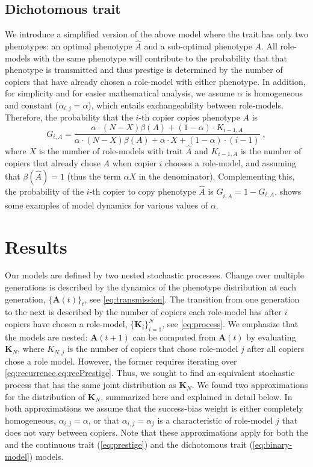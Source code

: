 \documentclass[12pt]{extarticle}
\let\vec\mathbf
\begin{document}
\subsection*{Dichotomous trait}
We introduce a simplified version of the above model where the trait has only two phenotypes: an optimal phenotype $\hat{A}$ and a sub-optimal phenotype $A$. 
All role-models with the same phenotype will contribute to the probability that that phenotype is transmitted and thus prestige is determined by the number of copiers that have already chosen a role-model with either phenotype.
In addition, for simplicity and for easier mathematical analysis, we assume $\alpha$ is homogeneous and constant ($\alpha_{i,j}=\alpha$), which entails exchangeability between role-models.
Therefore, the probability that the $i$-th copier {copies} phenotype $A$ is
\begin{equation}\label{eq:binary-model}
G_{i,A} = \frac{\alpha \cdot (N-X) \beta(A) + (1-\alpha) \cdot K_{i-1,A}}{\alpha \cdot (N-X) \beta(A) + \alpha \cdot X + (1-\alpha)\cdot(i-1)} \;,
\end{equation}
where $X$ is the number of role-models with trait $\hat{A}$ and $K_{i-1,A}$ is the number of copiers that already chose $A$ when copier $i$ chooses a role-model, and assuming that $\beta(\hat{A})=1$ (thus the term $\alpha X$ in the denominator).
Complementing this, the probability of the $i$-th copier to copy phenotype $\hat{A}$ is $G_{i, \hat{A}} = 1-G_{i,A}$.
 shows some examples of model dynamics for various values of $\alpha$.


\section*{Results}
Our models are defined by two nested stochastic processes. Change over multiple generations is described by the {dynamics of the} phenotype distribution at each generation, $\{\vec{A}(t)\}_t$, see \cref{eq:transmission}. The transition from one generation to the next is described by the number of copiers each role-model has after $i$ copiers have chosen a role-model, $\{\vec{K}_i\}_{i=1}^N$, see \cref{eq:process}.
We emphasize that the models are nested: $\vec{A}(t+1)$ can be computed from $\vec{A}(t)$ by evaluating $\vec{K}_{N}$, where $K_{N,j}$ is the number of copiers that chose role-model $j$ after all copiers chose a role model.
However, the former requires iterating over \cref{eq:recurrence,eq:recPrestige}.
Thus, we sought to find an equivalent stochastic process that has the same joint distribution as $\vec{K}_{N}$. 
We found two approximations for the distribution of $\vec{K}_{N}$, summarized here and explained in detail below.
In both approximations we assume that the success-bias weight is either completely homogeneous, $\alpha_{i,j}=\alpha$, or that $\alpha_{i,j}=\alpha_j$ is a characteristic of role-model $j$ that does not vary between copiers.
Note that these approximations apply for both the and the continuous trait (\cref{eq:prestige}) and the dichotomous trait (\cref{eq:binary-model}) models.
\end{document}
